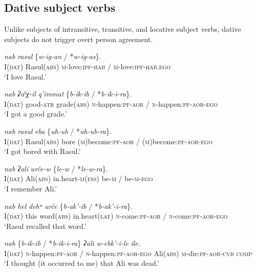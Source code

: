 ﻿\documentclass[output=paper]{langsci/langscibook}
\begin{document}
\subsection{Dative subject verbs}\label{dative-subject-verbs}

Unlike subjects of intransitive, transitive, and locative subject verbs,
dative subjects do not trigger overt person agreement.

\ea %
\gll \emph{nab} \emph{rasul} \{\emph{w-ig-an} / *\emph{w-ig-as}\}.\\
I(\textsc{dat}) Rasul(\textsc{abs}) \textsc{m}-love:\textsc{ipf}-\textsc{hab} / \textsc{m}-love:\textsc{ipf}-\textsc{hab}.\textsc{ego}\\
\glt `I love Rasul.'

\ex %
\gll \emph{nab} \emph{ʡaˤχ-il} \emph{q'immat} \{\emph{b-ik-ib} / *\emph{b-ik-i-ra}\}.\\
I(\textsc{dat}) good-\textsc{atr} grade(\textsc{abs}) \textsc{n}-happen:\textsc{pf}-\textsc{aor} / \textsc{n}-happen:\textsc{pf}-\textsc{aor}-\textsc{ego}\\
\glt `I got a good grade.'

\ex %
\gll \emph{nab} \emph{rasul} \emph{eba} \{\emph{uh-ub} / *\emph{uh-ub-ra}\}.\\
I(\textsc{dat}) Rasul(\textsc{abs}) bore (\textsc{m})become:\textsc{pf}-\textsc{aor} / (\textsc{m})become:\textsc{pf}-\textsc{aor}-\textsc{ego}\\
\glt `I got bored with Rasul.'

\ex %
\gll \emph{nab} \emph{ʡali} \emph{urče-w} \{\emph{le-w} / *\emph{le-w-ra}\}.\\
I(\textsc{dat}) Ali(\textsc{abs}) in.heart-\textsc{m(ess)} {be}-\textsc{m} / {be}-\textsc{m}-\textsc{ego}\\
\glt `I remember Ali.'

\ex %
\gll \emph{nab} \emph{hel} \emph{dehʷ} \emph{urče} \{\emph{b-ak'-ib} / *\emph{b-ak'-i-ra}\}.\\
I(\textsc{dat}) {this} word(\textsc{abs}) in.heart(\textsc{lat}) \textsc{n}-come:\textsc{pf}-\textsc{aor} / \textsc{n}-come:\textsc{pf}-\textsc{aor}-\textsc{ego}\\
\glt `Rasul recalled that word.'

\ex %
\gll \emph{nab} \{\emph{b-ik-ib} / *\emph{b-ik-i-ra}\} \emph{ʡali} \emph{w-ebk'-i-le} \emph{ile.}\\
I(\textsc{dat}) \textsc{n}-happen:\textsc{pf}-\textsc{aor} / \textsc{n}-happen:\textsc{pf}-\textsc{aor}-\textsc{ego} Ali(\textsc{abs}) \textsc{m}-die:\textsc{pf}-\textsc{aor}-\textsc{cvb} \textsc{comp}\\ 
\glt `I thought (it occurred to me) that Ali was dead.'
\z
\end{document}
